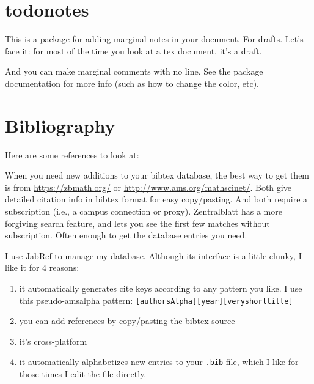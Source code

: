 \documentclass[11pt,oneside,draft]{amsart}
\begin{document}
\section{todonotes}
This is a package for adding  marginal notes in
your document.  For drafts.  Let's face it: for most of the time you
look at a tex document, it's a draft.

And you can make marginal comments with no line.  See the package
documentation for more info (such as how to change the color, etc).

\section{Bibliography}

Here are some references to look at:  \cite{ATC,sage,JN2010Complex,GO2012Infinite,Eve1991Cohomology,Eve1961Cohomology,EKMM1997Rings,Ada1974Stable}

When you need new additions to your bibtex database, the best way to
get them is from \url{https://zbmath.org/} or
\url{http://www.ams.org/mathscinet/}.  Both give detailed citation
info in bibtex format for easy copy/pasting.  And both require a
subscription (i.e., a campus connection or proxy).  Zentralblatt has a
more forgiving search feature, and lets you see the first few matches
without subscription.  Often enough to get the database entries you need.

I use \href{http://jabref.sourceforge.net/}{JabRef} to manage my
database.  Although its interface is a little clunky, I like it for 4 reasons:
\begin{enumerate}
\item it automatically generates cite keys according to any pattern
  you like.  I use this pseudo-amsalpha pattern: \texttt{[authorsAlpha][year][veryshorttitle]}
\item you can add references by copy/pasting the bibtex source
\item it's cross-platform
\item it automatically alphabetizes new entries to your \texttt{.bib} file, which I
  like for those times I edit the file directly.
\end{enumerate}
\end{document}
